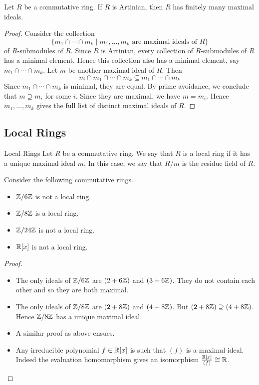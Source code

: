 \documentclass[a4paper]{article}
\begin{document}
\begin{prp}{}{} Let $R$ be a commutative ring. If $R$ is Artinian, then $R$ has finitely many maximal ideals. 
\begin{proof}
Consider the collection $$\{m_1\cap\cdots\cap m_k\;|\;m_1,\dots,m_k\text{ are maximal ideals of }R\}$$ of $R$-submodules of $R$. Since $R$ is Artinian, every collection of $R$-submodules of $R$ has a minimal element. Hence this collection also has a minimal element, say $m_1\cap\cdots\cap m_k$. Let $m$ be another maximal ideal of $R$. Then $$m\cap m_1\cap\cdots\cap m_k\subseteq m_1\cap\cdots\cap m_k$$ Since $m_1\cap\cdots\cap m_k$ is minimal, they are equal. By prime avoidance, we conclude that $m\supseteq m_i$ for some $i$. Since they are maximal, we have $m=m_i$. Hence $m_1,\dots,m_k$ gives the full list of distinct maximal ideals of $R$. 
\end{proof}
\end{prp}

\subsection{Local Rings}
\begin{defn}{Local Rings}{} Let $R$ be a commutative ring. We say that $R$ is a local ring if it has a unique maximal ideal $m$. In this case, we say that $R/m$ is the residue field of $R$. 
\end{defn}

\begin{eg}{}{} Consider the following commutative rings. 
\begin{itemize}
\item $\mathbb{Z}/6\mathbb{Z}$ is not a local ring. 
\item $\mathbb{Z}/8\mathbb{Z}$ is a local ring. 
\item $\mathbb{Z}/24\mathbb{Z}$ is not a local ring. 
\item $\mathbb{R}[x]$ is not a local ring. 
\end{itemize} 
\begin{proof}~\\
\begin{itemize}
\item The only ideals of $\mathbb{Z}/6\mathbb{Z}$ are $(2+6\mathbb{Z})$ and $(3+6\mathbb{Z})$. They do not contain each other and so they are both maximal. 
\item The only ideals of $\mathbb{Z}/8\mathbb{Z}$ are $(2+8\mathbb{Z})$ and $(4+8\mathbb{Z})$. But $(2+8\mathbb{Z})\supseteq(4+8\mathbb{Z})$. Hence $\mathbb{Z}/8\mathbb{Z}$ has a unique maximal ideal. 
\item A similar proof as above ensues. 
\item Any irreducible polynomial $f\in\mathbb{R}[x]$ is such that $(f)$ is a maximal ideal. Indeed the evaluation homomorphism gives an isomorphism $\frac{\mathbb{R}[x]}{(f)}\cong\mathbb{R}$. 
\end{itemize}
\end{proof}
\end{eg}
\end{document}
